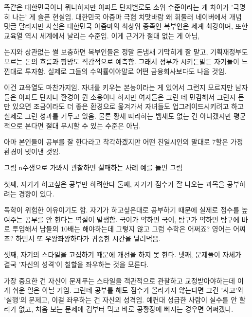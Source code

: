 똑같은 대한민국이니 뭐니하지만 아파트 단지별로도 소위 수준이라는 게 차이가 '극명히 나는' 게 슬픈 현실임.
대한민국 아줌마 극혐 치맛바람 왜 휘둘러 네이버에서 개념 댓글 달리지만 사실은
대한민국 아줌마의 최상위 종족인 복부인은 세계 최강이며, 또한 교육열 역시 세계에서 날리는 수준임.
이게 근거가 절대 없는 게 아님,
\vspace{5mm}

논지와 상관없는 썰 보충하면 복부인들은 정말 돈냄새 기막히게 잘 맡고, 기획재정부도 모르는 돈의 흐름과 향방도 직감적으로 예측함.
그래서 정부가 시키든말든 자기들이 느낀대로 투자함. 실제로 그들의 수익률이야말로 어떤 금융회사보다도 나을 것임.
\vspace{5mm}

이건 교육열도 마찬가지임. 자녀를 키우는 본능이라는 게 있어서 그런지 모르지만
남자들은 아파트 단지나 환경이 뭔 소용이냐 하지만 여자들은 그런 데 민감해서 그런지
돈만 있으면 조금이라도 더 좋은 환경으로 옮겨가서 자녀들도 업그레이드시키려고 하고 실제로 그런 성과를 거두고 있음.
물론 황새 따라하는 뱁새도 없는 건 아니겠지만 평균적으로 본다면 절대 무시할 수 있는 수준은 아님.
\vspace{5mm}

아마 본인들이 공부를 잘 한다라고 착각하겠지만
어떤 친일시인의 말대로 7할은 가정환경이 빚어낸 것임.
\vspace{5mm}

그럼 n수생으로 가봐서 관찰하면 실패하는 사례 예를 들면 그럼
\vspace{5mm}

첫쨰, 자기가 하고싶은 공부만 하려한다
둘째, 자기가 점수가 잘 나오는 과목을 공부하려는 경향이 있다.
\vspace{5mm}

독학이 위험한 이유이기도 함. 자기가 하고싶은대로 공부하기 때문에 실제로 점수를 높여주는 공부를 안 한다는 역설이 발생함.
국어가 약하면 국어, 탐구가 약하면 탐구에 바로 투입해서 남들의 10배는 해야하는데 그렇지 않고
그럼 수학은 어쩌죠? 영어는 어쪄죠? 하면서 또 우왕좌왕하다가 귀중한 시간을 날려먹음.
\vspace{5mm}

셋째, 자기의 스타일을 고집하기 때문에 개선을 하지 못 한다.
넷째, 문제풀이 자체가 결국 '자신의 성격'이 칠할을 좌우하는 것을 모른다.
\vspace{5mm}

가장 중요한 건 자신이 문제푸는 스타일을 객관적으로 관찰하고 교정받아야하는데 이게 쉬운 일은 아닐 거임.
그런데 공부를 해도 점수가 올라가지 않는다면 그건 '사고'와 '실행'의 문제고, 이걸 좌우하는 건 자신의 성격임.
예컨대 성급한 사람이 실수를 안 할 리가 없고, 처음 보는 문제에 겁부터 먹고 바로 공황장애 빠지는 경우면 어쩌겠나.
\vspace{5mm}

